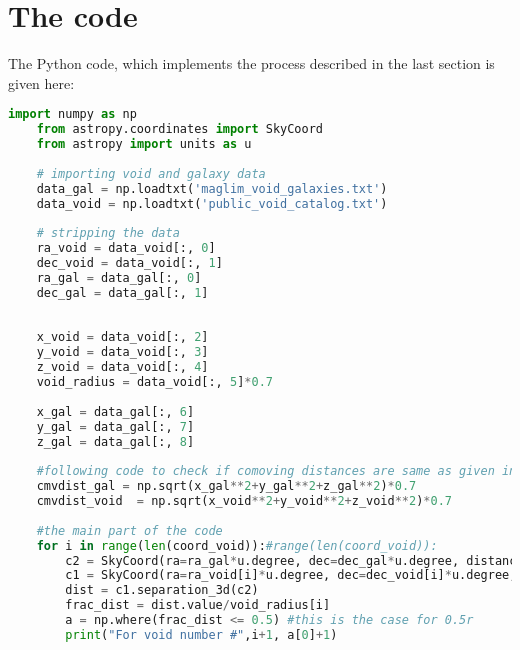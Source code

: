 \section{The code}
The Python code, which implements the process described in the last section is given here:
\begin{lstlisting}[language=Python, caption=Code for filtering wall galaxies]
	import numpy as np
	from astropy.coordinates import SkyCoord
	from astropy import units as u
	
	# importing void and galaxy data
	data_gal = np.loadtxt('maglim_void_galaxies.txt')
	data_void = np.loadtxt('public_void_catalog.txt')
	
	# stripping the data
	ra_void = data_void[:, 0]
	dec_void = data_void[:, 1]
	ra_gal = data_gal[:, 0]
	dec_gal = data_gal[:, 1]
	
	
	x_void = data_void[:, 2] 
	y_void = data_void[:, 3]
	z_void = data_void[:, 4]
	void_radius = data_void[:, 5]*0.7
	
	x_gal = data_gal[:, 6]
	y_gal = data_gal[:, 7]
	z_gal = data_gal[:, 8]
	
	#following code to check if comoving distances are same as given in catalog
	cmvdist_gal = np.sqrt(x_gal**2+y_gal**2+z_gal**2)*0.7
	cmvdist_void  = np.sqrt(x_void**2+y_void**2+z_void**2)*0.7
	
	#the main part of the code
	for i in range(len(coord_void)):#range(len(coord_void)):
		c2 = SkyCoord(ra=ra_gal*u.degree, dec=dec_gal*u.degree, distance=cmvdist_gal*u.Mpc)
		c1 = SkyCoord(ra=ra_void[i]*u.degree, dec=dec_void[i]*u.degree, distance=cmvdist_void[i]*u.Mpc)
		dist = c1.separation_3d(c2)
		frac_dist = dist.value/void_radius[i]
		a = np.where(frac_dist <= 0.5) #this is the case for 0.5r
		print("For void number #",i+1, a[0]+1)
	
\end{lstlisting}


    



